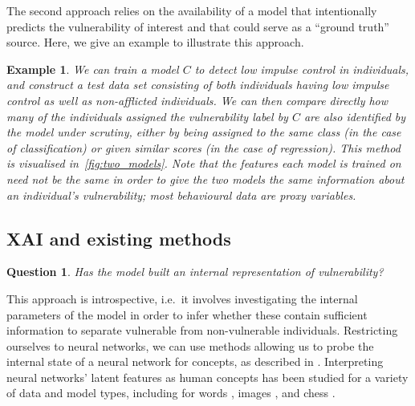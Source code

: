 \documentclass[11pt,theapa]{article}
\theoremstyle{plain}
\newtheorem{question}{Question}
\newtheorem{case}{Example}
\newcommand{\vulnerability}{{low impulse control}} %
\begin{document}
The second approach relies on the availability of a model that intentionally predicts the vulnerability of interest and that could serve as a ``ground truth'' source. Here, we give an example to illustrate this approach.
\begin{case} 
We can train a model $C$ to detect \vulnerability{} in individuals, and construct a test data set consisting of both individuals having \vulnerability{} as well as non-afflicted individuals. We can then compare directly how many of the individuals assigned the vulnerability label by $C$ are also identified by the model under scrutiny, either by being assigned to the same class (in the case of classification) or given similar scores (in the case of regression). This method is visualised in~\cref{fig:two_models}. Note that the features each model is trained on need not be the same in order to give the two models the same information about an individual's vulnerability; most behavioural data are proxy variables.
\end{case}

\subsection{XAI and existing methods}\label{sec:xai}
\begin{question}
    Has the model built an internal representation of vulnerability?
\end{question}

This approach is introspective, i.e.\ it involves investigating the internal parameters of the model in order to infer whether these contain sufficient information to separate vulnerable from non-vulnerable individuals. 
Restricting ourselves to neural networks, we can use methods allowing us to probe the internal state of a neural network for concepts, as described in \cite{kim_tcav}. %
Interpreting neural networks' latent features as human concepts has been studied for a variety of data and model types, including for words \cite{NIPS2013_words}, images \cite{concepts_gans}, and chess \cite{alphazero_concepts}.
\end{document}
